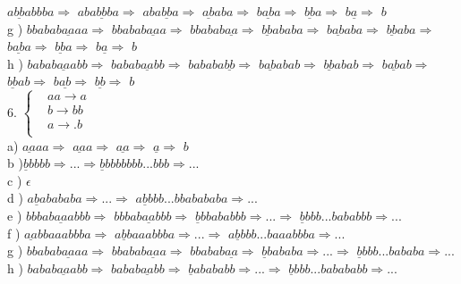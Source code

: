 \documentclass{article}
\begin{document}
$a\underline{bb}abbba \Rightarrow$
$aba\underline{bb}ba \Rightarrow$
$aba\underline{bb}a \Rightarrow$
$\underline{ab}aba \Rightarrow$
$b\underline{ab}a \Rightarrow$
$\underline{bb}a \Rightarrow$
$b\underline{a} \Rightarrow$
$b$
\\
g ) $bbabab\underline{aa}aa \Rightarrow$
$bbabab\underline{aa}a \Rightarrow$
$bbabab\underline{aa} \Rightarrow$
$\underline{bb}ababa \Rightarrow$
$b\underline{ab}aba \Rightarrow$
$\underline{bb}aba \Rightarrow$
$b\underline{ab}a \Rightarrow$
$\underline{bb}a \Rightarrow$
$b\underline{a} \Rightarrow$
$b$
\\
h ) $babab\underline{aa}abb \Rightarrow$
$babab\underline{aa}bb \Rightarrow$
$bababa\underline{bb} \Rightarrow$
$b\underline{ab}abab \Rightarrow$
$\underline{bb}abab \Rightarrow$
$b\underline{ab}ab \Rightarrow$
$\underline{bb}ab \Rightarrow$
$b\underline{ab} \Rightarrow$
$\underline{bb} \Rightarrow$
$b$
\\
6. $ \left\{
\begin{aligned}
&aa \rightarrow a \\
&b \rightarrow bb \\
&a \rightarrow .b\\
\end{aligned}
\right.$ 
\\
a) $\underline{aa}aa \Rightarrow$
$\underline{aa}a \Rightarrow$
$\underline{aa} \Rightarrow$
$\underline{a} \Rightarrow$
$b$
\\
b )$\underline{b}bbbb \Rightarrow ... \Rightarrow \underline{b}bbbbbbb...bbb \Rightarrow ...$ 
\\
c ) $\epsilon$
\\
d ) $a\underline{b}abababa \Rightarrow ... \Rightarrow $
$a\underline{b}bbb...bbabababa \Rightarrow ...  $
\\
e ) $bbbab\underline{aa}abbb \Rightarrow$
$bbbab\underline{aa}bbb \Rightarrow$
$\underline{b}bbababbb \Rightarrow ... \Rightarrow $
$\underline{b}bbb...bababbb \Rightarrow ...$
\\
f ) $\underline{aa}bbaaabbba \Rightarrow$
$a\underline{b}baaabbba \Rightarrow ... \Rightarrow$
$a\underline{b}bbb...baaabbba \Rightarrow ... $
\\
g ) $bbabab\underline{aa}aa \Rightarrow$
$bbabab\underline{aa}a \Rightarrow$
$bbabab\underline{aa} \Rightarrow$
$\underline{b}bababa \Rightarrow ... \Rightarrow$
$\underline{b}bbb...bababa \Rightarrow ...$
\\
h ) $babab\underline{aa}abb \Rightarrow$
$babab\underline{aa}bb \Rightarrow$
$\underline{b}abababb \Rightarrow... \Rightarrow$
$\underline{b}bbb...babababb \Rightarrow...$
\\
\end{document}
